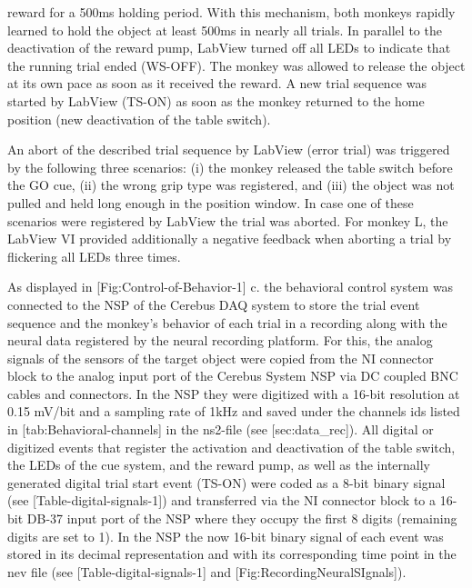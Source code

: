 reward for a 500ms holding period. With this mechanism, both monkeys rapidly learned to hold the object at least 500ms in nearly all trials. In parallel to the deactivation of the reward pump, LabView turned off all LEDs to indicate that the running trial ended (WS-OFF). The monkey was allowed to release the object at its own pace as soon as it received the reward. A new trial sequence was started by LabView (TS-ON) as soon as the monkey returned to the home position (new deactivation of the table switch).

An abort of the described trial sequence by LabView (error trial) was triggered by the following three scenarios: (i) the monkey released the table switch before the GO cue, (ii) the wrong grip type was registered, and (iii) the object was not pulled and held long enough in the position window. In case one of these scenarios were registered by LabView the trial was aborted. For monkey L, the LabView VI provided additionally a negative feedback when aborting a trial by flickering all LEDs three times. 

As displayed in [Fig:Control-of-Behavior-1] c. the behavioral control system was connected to the NSP of the Cerebus DAQ system to store the trial event sequence and the monkey's behavior of each trial in a recording along with the neural data registered by the neural recording platform. For this, the analog signals of the sensors of the target object were copied from the NI connector block to the analog input port of the Cerebus System NSP via DC coupled BNC cables and connectors. In the NSP they were digitized with a 16-bit resolution at 0.15 mV/bit and a sampling rate of 1kHz and saved under the channels ids listed in [tab:Behavioral-channels] in the ns2-file (see [sec:data\_rec]). All digital or digitized events that register the activation and deactivation of the table switch, the LEDs of the cue system, and the reward pump, as well as the internally generated digital trial start event (TS-ON) were coded as a 8-bit binary signal (see [Table-digital-signals-1]) and transferred via the NI connector block to a 16-bit DB-37 input port of the NSP where they occupy the first 8 digits (remaining digits are set to 1). In the NSP the now 16-bit binary signal of each event was stored in its decimal representation and with its corresponding time point in the nev file (see [Table-digital-signals-1] and [Fig:RecordingNeuralSIgnals]).

